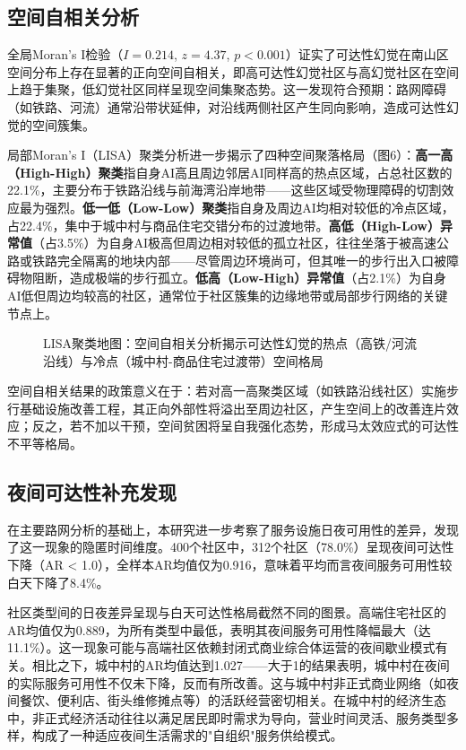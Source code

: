 \documentclass[10pt,conference]{IEEEtran}
\begin{document}
\subsection{空间自相关分析}

全局Moran's I检验（$I = 0.214$, $z = 4.37$, $p < 0.001$）证实了可达性幻觉在南山区空间分布上存在显著的正向空间自相关，即高可达性幻觉社区与高幻觉社区在空间上趋于集聚，低幻觉社区同样呈现空间集聚态势。这一发现符合预期：路网障碍（如铁路、河流）通常沿带状延伸，对沿线两侧社区产生同向影响，造成可达性幻觉的空间簇集。

局部Moran's I（LISA）聚类分析进一步揭示了四种空间聚落格局（图6）：\textbf{高一高（High-High）聚类}指自身AI高且周边邻居AI同样高的热点区域，占总社区数的22.1\%，主要分布于铁路沿线与前海湾沿岸地带——这些区域受物理障碍的切割效应最为强烈。\textbf{低一低（Low-Low）聚类}指自身及周边AI均相对较低的冷点区域，占22.4\%，集中于城中村与商品住宅交错分布的过渡地带。\textbf{高低（High-Low）异常值}（占3.5\%）为自身AI极高但周边相对较低的孤立社区，往往坐落于被高速公路或铁路完全隔离的地块内部——尽管周边环境尚可，但其唯一的步行出入口被障碍物阻断，造成极端的步行孤立。\textbf{低高（Low-High）异常值}（占2.1\%）为自身AI低但周边均较高的社区，通常位于社区簇集的边缘地带或局部步行网络的关键节点上。

\begin{figure}[htbp]
\centering
\caption{LISA聚类地图：空间自相关分析揭示可达性幻觉的热点（高铁/河流沿线）与冷点（城中村-商品住宅过渡带）空间格局}
\label{fig:lisa}
\end{figure}

空间自相关结果的政策意义在于：若对高一高聚类区域（如铁路沿线社区）实施步行基础设施改善工程，其正向外部性将溢出至周边社区，产生空间上的改善连片效应；反之，若不加以干预，空间贫困将呈自我强化态势，形成马太效应式的可达性不平等格局。

\subsection{夜间可达性补充发现}

在主要路网分析的基础上，本研究进一步考察了服务设施日夜可用性的差异，发现了这一现象的隐匿时间维度。400个社区中，312个社区（78.0\%）呈现夜间可达性下降（AR < 1.0），全样本AR均值仅为0.916，意味着平均而言夜间服务可用性较白天下降了8.4\%。

社区类型间的日夜差异呈现与白天可达性格局截然不同的图景。高端住宅社区的AR均值仅为0.889，为所有类型中最低，表明其夜间服务可用性降幅最大（达11.1\%）。这一现象可能与高端社区依赖封闭式商业综合体运营的夜间歇业模式有关。相比之下，城中村的AR均值达到1.027——大于1的结果表明，城中村在夜间的实际服务可用性不仅未下降，反而有所改善。这与城中村非正式商业网络（如夜间餐饮、便利店、街头维修摊点等）的活跃经营密切相关。在城中村的经济生态中，非正式经济活动往往以满足居民即时需求为导向，营业时间灵活、服务类型多样，构成了一种适应夜间生活需求的"自组织"服务供给模式。
\end{document}

